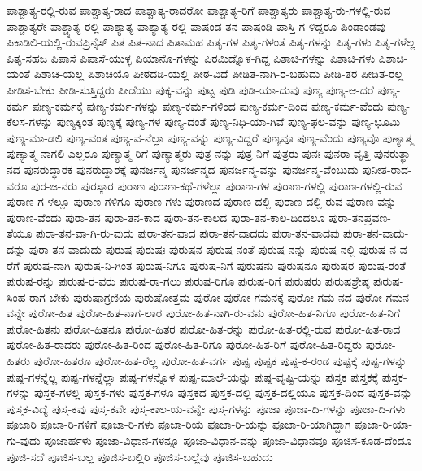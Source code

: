 {ಪಾಶ್ಚಾತ್ಯ-ರಲ್ಲಿ-ರುವ
ಪಾಶ್ಚಾತ್ಯ-ರಾದ
ಪಾಶ್ಚಾತ್ಯ-ರಾದರೋ
ಪಾಶ್ಚಾತ್ಯ-ರಿಗೆ
ಪಾಶ್ಚಾತ್ಯರು
ಪಾಶ್ಚಾತ್ಯ-ರು-ಗಳಲ್ಲಿ-ರುವ
ಪಾಶ್ಚಾತ್ಯರೇ
ಪಾಶ್ಚ್ಯಾತ್ಯ-ರಲ್ಲಿ
ಪಾಶ್ಯಾತ್ಯ
ಪಾಶ್ಯಾತ್ಯ-ರಲ್ಲಿ
ಪಾಷಂಡ-ತನ
ಪಾಷಂಡಿ
ಪಾಸ್ತಿ-ಗ-ಳಿದ್ದರೂ
ಪಿಂಡಾಂಡವು
ಪಿಕಾಡಿಲಿ-ಯಲ್ಲಿ-ರುವಪ್ರಿನ್ಸೆಸ್
ಪಿತ
ಪಿತ-ನಾದ
ಪಿತಾಮಹ
ಪಿತೃ-ಗಳ
ಪಿತೃ-ಗಳಂತೆ
ಪಿತೃ-ಗಳನ್ನು
ಪಿತೃ-ಗಳು
ಪಿತೃ-ಗಳೆಲ್ಲ
ಪಿತೃ-ಸಹಜ
ಪಿಪಾಸೆ
ಪಿಪಾಸೆ-ಯುಳ್ಳ
ಪಿಯಾನೊ-ಗಳನ್ನು
ಪಿರಮಿಡ್ನೊಳ-ಗಿದ್ದ
ಪಿಶಾಚಿ-ಗಳನ್ನು
ಪಿಶಾಚಿ-ಗಳು
ಪಿಶಾಚಿ-ಯಂತೆ
ಪಿಶಾಚಿ-ಯಲ್ಲ
ಪಿಶಾಚಿಯೊ
ಪೀಠದಡಿ-ಯಲ್ಲಿ
ಪೀಠ-ವಿದೆ
ಪೀಡಿತ-ನಾಗಿ-ರ-ಬಹುದು
ಪೀಡಿ-ತರ
ಪೀಡಿತ-ರಲ್ಲ
ಪೀಡಿಸ-ಬೇಕು
ಪೀಡಿ-ಸುತ್ತಿದ್ದರು
ಪೀಡೆಯು
ಪುಕ್ಕ-ವನ್ನು
ಪುಟ್ಟ
ಪುಡಿ
ಪುಡಿ-ಯಾ-ದುವು
ಪುಣ್ಯ
ಪುಣ್ಯ-ಆ-ದರೆ
ಪುಣ್ಯ-ಕರ್ಮ
ಪುಣ್ಯ-ಕರ್ಮಕ್ಕೆ
ಪುಣ್ಯ-ಕರ್ಮ-ಗಳನ್ನು
ಪುಣ್ಯ-ಕರ್ಮ-ಗಳಿಂದ
ಪುಣ್ಯ-ಕರ್ಮ-ದಿಂದ
ಪುಣ್ಯ-ಕರ್ಮ-ವೆಂದು
ಪುಣ್ಯ-ಕೆಲಸ-ಗಳನ್ನು
ಪುಣ್ಯಕ್ಕಿಂತ
ಪುಣ್ಯಕ್ಕೆ
ಪುಣ್ಯ-ಗಳ
ಪುಣ್ಯ-ದಂತೆ
ಪುಣ್ಯ-ನಿಧಿ-ಯಾ-ಗಿವೆ
ಪುಣ್ಯ-ಫಲ-ವನ್ನು
ಪುಣ್ಯ-ಭೂಮಿ
ಪುಣ್ಯ-ಮಾ-ಡಲಿ
ಪುಣ್ಯ-ವಂತ
ಪುಣ್ಯ-ವ-ನೆಲ್ಲಾ
ಪುಣ್ಯ-ವನ್ನು
ಪುಣ್ಯ-ವಿದ್ದರೆ
ಪುಣ್ಯವೂ
ಪುಣ್ಯ-ವೆಂದು
ಪುಣ್ಯವೊ
ಪುಣ್ಯಾತ್ಮ
ಪುಣ್ಯಾತ್ಮ-ನಾಗಲಿ-ಎಲ್ಲರೂ
ಪುಣ್ಯಾತ್ಮ-ರಿಗೆ
ಪುಣ್ಯಾತ್ಮರು
ಪುತ್ರ-ನನ್ನು
ಪುತ್ರ-ನಿಗೆ
ಪುತ್ರರು
ಪುನಃ
ಪುನರಾ-ವೃತ್ತಿ
ಪುನರುತ್ಥಾ-ನದ
ಪುನರುದ್ಧಾರಕ
ಪುನರುದ್ಧಾರಕ್ಕೆ
ಪುನರ್ಜನ್ಮ
ಪುನರ್ಜನ್ಮದ
ಪುನರ್ಜನ್ಮ-ವನ್ನು
ಪುನರ್ಜನ್ಮ-ವೆಂಬುದು
ಪುನೀತ-ರಾದ-ವರೂ
ಪುರ-ಜ-ನರು
ಪುರಸ್ಕಾರ
ಪುರಾಣ
ಪುರಾಣ-ಕಥೆ-ಗಳೆಲ್ಲಾ
ಪುರಾಣ-ಗಳ
ಪುರಾಣ-ಗಳಲ್ಲಿ
ಪುರಾಣ-ಗಳಲ್ಲಿ-ರುವ
ಪುರಾಣ-ಗ-ಳಲ್ಲೂ
ಪುರಾಣ-ಗಳಿಗೂ
ಪುರಾಣ-ಗಳು
ಪುರಾಣದ
ಪುರಾಣ-ದಲ್ಲಿ
ಪುರಾಣ-ದಲ್ಲಿ-ರುವ
ಪುರಾಣ-ವನ್ನು
ಪುರಾಣ-ವೆಂದು
ಪುರಾ-ತನ
ಪುರಾ-ತನ-ಕಾದ
ಪುರಾ-ತನ-ಕಾಲದ
ಪುರಾ-ತನ-ಕಾಲ-ದಿಂದಲೂ
ಪುರಾ-ತನಪ್ರವಣ-ತೆಯೂ
ಪುರಾ-ತನ-ವಾ-ಗಿ-ರು-ವುದು
ಪುರಾ-ತನ-ವಾದ
ಪುರಾ-ತನ-ವಾದದು
ಪುರಾ-ತನ-ವಾದವು
ಪುರಾ-ತನ-ವಾದು-ದನ್ನು
ಪುರಾ-ತನ-ವಾದುದು
ಪುರುಷ
ಪುರುಷಃ
ಪುರುಷನ
ಪುರುಷ-ನಂತೆ
ಪುರುಷ-ನನ್ನು
ಪುರುಷ-ನಲ್ಲಿ
ಪುರುಷ-ನ-ವ-ರೆಗೆ
ಪುರುಷ-ನಾಗಿ
ಪುರುಷ-ನಿ-ಗಿಂತ
ಪುರುಷ-ನಿಗೂ
ಪುರುಷ-ನಿಗೆ
ಪುರುಷನು
ಪುರುಷನೂ
ಪುರುಷರ
ಪುರುಷ-ರಂತೆ
ಪುರುಷ-ರನ್ನು
ಪುರುಷ-ರ-ವರು
ಪುರುಷ-ರಾ-ಗಲು
ಪುರುಷ-ರಿಗೂ
ಪುರುಷ-ರಿಗೆ
ಪುರುಷರು
ಪುರುಷಶ್ರೇಷ್ಠ
ಪುರುಷ-ಸಿಂಹ-ರಾಗ-ಬೇಕು
ಪುರುಷಾಗ್ರಣಿಯ
ಪುರುಷೋತ್ತಮ
ಪುರೋ
ಪುರೋ-ಗಮನಕ್ಕೆ
ಪುರೋ-ಗಮ-ನದ
ಪುರೋ-ಗಮನ-ವನ್ನೇ
ಪುರೋ-ಹಿತ
ಪುರೋ-ಹಿತ-ನಾಗ-ಲಾರ
ಪುರೋ-ಹಿತ-ನಾಗಿ-ರು-ವನು
ಪುರೋ-ಹಿತ-ನಿಗೂ
ಪುರೋ-ಹಿತ-ನಿಗೆ
ಪುರೋ-ಹಿತನು
ಪುರೋ-ಹಿತನೂ
ಪುರೋ-ಹಿತರ
ಪುರೋ-ಹಿತ-ರನ್ನು
ಪುರೋ-ಹಿತ-ರಲ್ಲಿ-ರುವ
ಪುರೋ-ಹಿತ-ರಾದ
ಪುರೋ-ಹಿತ-ರಾದರು
ಪುರೋ-ಹಿತ-ರಿಂದ
ಪುರೋ-ಹಿತ-ರಿಗೂ
ಪುರೋ-ಹಿತ-ರಿಗೆ
ಪುರೋ-ಹಿತ-ರಿದ್ದರು
ಪುರೋ-ಹಿತರು
ಪುರೋ-ಹಿತರೂ
ಪುರೋ-ಹಿತ-ರೆಲ್ಲ
ಪುರೋ-ಹಿತ-ವರ್ಗ
ಪುಷ್ಪ
ಪುಷ್ಪಕ
ಪುಷ್ಪ-ಕ-ರಂಡ
ಪುಷ್ಪಕ್ಕೆ
ಪುಷ್ಪ-ಗಳನ್ನು
ಪುಷ್ಪ-ಗಳನ್ನೆಲ್ಲ
ಪುಷ್ಪ-ಗಳನ್ನೆಲ್ಲಾ
ಪುಷ್ಪ-ಗಳನ್ನೊಳ
ಪುಷ್ಪ-ಮಾಲೆ-ಯನ್ನು
ಪುಷ್ಪ-ವೃಷ್ಟಿ-ಯನ್ನು
ಪುಸ್ತಕ
ಪುಸ್ತಕಕ್ಕೆ
ಪುಸ್ತಕ-ಗಳನ್ನು
ಪುಸ್ತಕ-ಗಳಲ್ಲಿ
ಪುಸ್ತಕ-ಗಳು
ಪುಸ್ತಕ-ಗಳೂ
ಪುಸ್ತಕದ
ಪುಸ್ತಕ-ದಲ್ಲಿ
ಪುಸ್ತಕ-ದಲ್ಲಿಯೂ
ಪುಸ್ತಕ-ದಿಂದ
ಪುಸ್ತಕ-ವನ್ನು
ಪುಸ್ತಕ-ವಿದ್ಯೆ
ಪುಸ್ತ-ಕವು
ಪುಸ್ತ-ಕವೇ
ಪುಸ್ತ-ಕಾಲ-ಯ-ವನ್ನೇ
ಪುಸ್ತ-ಗಳನ್ನು
ಪೂಜಾ
ಪೂಜಾ-ದಿ-ಗಳನ್ನು
ಪೂಜಾ-ದಿ-ಗಳು
ಪೂಜಾರಿ
ಪೂಜಾ-ರಿ-ಗಳಿಗೆ
ಪೂಜಾ-ರಿ-ಗಳು
ಪೂಜಾ-ರಿಯ
ಪೂಜಾ-ರಿ-ಯನ್ನು
ಪೂಜಾ-ರಿ-ಯಾಗಿದ್ದಾಗ
ಪೂಜಾ-ರಿ-ಯಾ-ಗು-ವುದು
ಪೂಜಾರ್ಹಳು
ಪೂಜಾ-ವಿಧಾನ-ಗಳನ್ನೂ
ಪೂಜಾ-ವಿಧಾನ-ವನ್ನು
ಪೂಜಾ-ವಿಧಾನವೂ
ಪೂಜಿಸ-ಕೂಡ-ದೆಂದೂ
ಪೂಜಿ-ಸದೆ
ಪೂಜಿಸ-ಬಲ್ಲ
ಪೂಜಿಸ-ಬಲ್ಲಿರಿ
ಪೂಜಿಸ-ಬಲ್ಲೆವು
ಪೂಜಿಸ-ಬಹುದು
}
